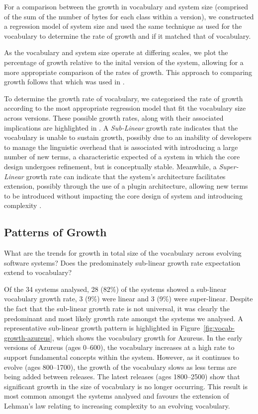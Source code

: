 For a comparison between the growth in vocabulary and system size (comprised of the sum of the number of bytes for each class within a version), we constructed a regression model of system size and used the same technique as used for the vocabulary to determine the rate of growth and if it matched that of vocabulary.

As the vocabulary and system size operate at differing scales, we plot the percentage of growth relative to the inital version of the system, allowing for a more appropriate comparison of the rates of growth. This approach to comparing growth follows that which was used in \cite{Paulson04a}.

To determine the growth rate of vocabulary, we categorised the rate of growth according to the most appropriate regression model that fit the vocabulary size across versions. These possible growth rates, along with their associated implications are highlighted in . A \emph{Sub-Linear} growth rate indicates that the vocabulary is unable to sustain growth, possibly due to an inability of developers to manage the linguistic overhead that is associated with introducing a large number of new terms, a characteristic expected of a system in which the core design undergoes refinement, but is conceptually stable. Meanwhile, a \emph{Super-Linear} growth rate can indicate that the system's architecture facilitates extension, possibly through the use of a plugin architecture, allowing new terms to be introduced without impacting the core design of system and introducing complexity \cite{Godfrey01a}.


\subsection{Patterns of Growth} %
\label{sub:patterns_of_growth}

What are the trends for growth in total size of the vocabulary across evolving software systems? Does the predominately sub-linear growth rate expectation extend to vocabulary?

Of the 34 systems analysed, 28 (82\%) of the systems showed a sub-linear vocabulary growth rate, 3 (9\%) were linear and 3 (9\%) were super-linear. Despite the fact that the sub-linear growth rate is not universal, it was clearly the predominant and most likely growth rate amongst the systems we analysed. A representative sub-linear growth pattern is highlighted in Figure~\ref{fig:vocab-growth-azureus}, which shows the vocabulary growth for Azureus. In the early versions of Azureus (ages 0--600), the vocabulary increases at a high rate to support fundamental concepts within the system. However, as it continues to evolve (ages 800--1700), the growth of the vocabulary slows as less terms are being added between releases. The latest releases (ages 1800--2500) show that significant growth in the size of vocabulary is no longer occurring. This result is most common amongst the systems analysed and favours the extension of Lehman's law relating to increasing complexity to an evolving vocabulary.

